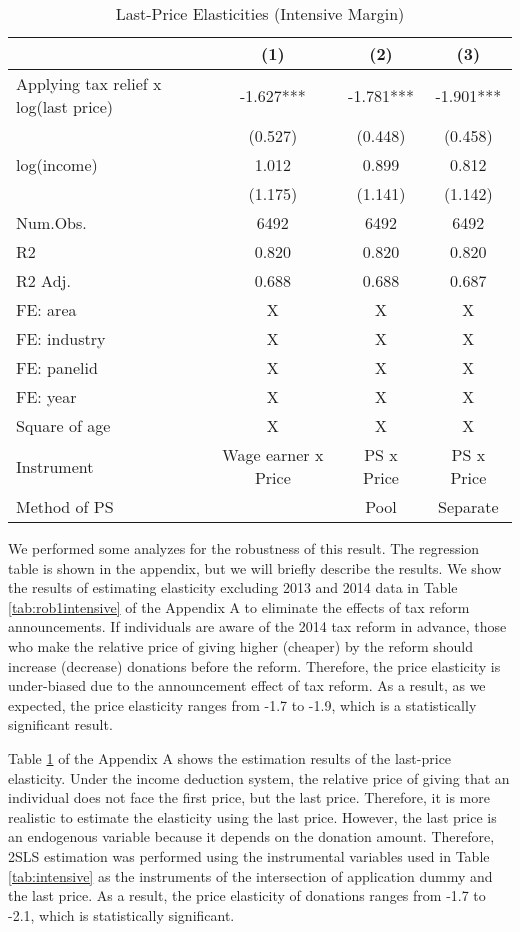 \documentclass[
  11pt,
  a4paper,
]{article}
\begin{document}
\begin{table}

\caption{\label{tab:rob2intensive}Last-Price Elasticities (Intensive Margin)}
\centering
\begin{tabular}[t]{lccc}
\toprule
  & (1) & (2) & (3)\\
\midrule
Applying tax relief x log(last price) & -1.627*** & -1.781*** & -1.901***\\
 & (0.527) & (0.448) & (0.458)\\
log(income) & 1.012 & 0.899 & 0.812\\
 & (1.175) & (1.141) & (1.142)\\
\midrule
Num.Obs. & 6492 & 6492 & 6492\\
R2 & 0.820 & 0.820 & 0.820\\
R2 Adj. & 0.688 & 0.688 & 0.687\\
FE: area & X & X & X\\
FE: industry & X & X & X\\
FE: panelid & X & X & X\\
FE: year & X & X & X\\
Square of age & X & X & X\\
Instrument & Wage earner x Price & PS x Price & PS x Price\\
Method of PS &  & Pool & Separate\\
\bottomrule
\end{tabular}
\end{table}

We performed some analyzes for the robustness of this result.
The regression table is shown in the appendix,
but we will briefly describe the results.
We show the results of estimating elasticity excluding 2013 and 2014 data
in Table \ref{tab:rob1intensive} of the Appendix A
to eliminate the effects of tax reform announcements.
If individuals are aware of the 2014 tax reform in advance,
those who make the relative price of giving higher (cheaper)
by the reform should increase (decrease) donations before the reform.
Therefore, the price elasticity is under-biased
due to the announcement effect of tax reform.
As a result, as we expected,
the price elasticity ranges from -1.7 to -1.9,
which is a statistically significant result.

Table \ref{tab:rob2intensive} of the Appendix A shows
the estimation results of the last-price elasticity.
Under the income deduction system,
the relative price of giving that an individual
does not face the first price, but the last price.
Therefore, it is more realistic to estimate the elasticity
using the last price.
However, the last price is an endogenous variable
because it depends on the donation amount.
Therefore, 2SLS estimation was performed using the instrumental variables
used in Table \ref{tab:intensive} as the instruments of
the intersection of application dummy and the last price.
As a result, the price elasticity of donations ranges from -1.7 to -2.1,
which is statistically significant.
\end{document}
